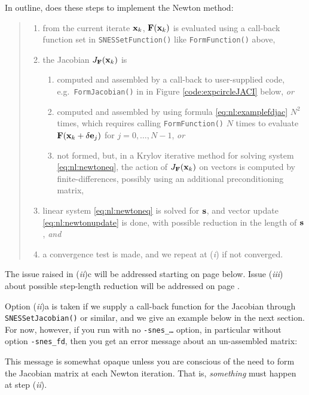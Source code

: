 In outline, \pSNES does these steps to implement the Newton method:
\begin{quote}
	\renewcommand{\labelenumi}{(\emph{\roman{enumi}})}
	\renewcommand{\labelenumii}{\emph{\alph{enumii}}.}
	\begin{enumerate}
	\item from the current iterate $\mathbf{x}_k$, $\mathbf{F}(\mathbf{x}_k)$ is evaluated using a call-back function set in \texttt{SNESSetFunction()} like \texttt{FormFunction()} above,
	\item the Jacobian $J_{\mathbf{F}}(\mathbf{x}_k)$ is
	    \begin{enumerate}
	    \item computed and assembled by a call-back to user-supplied code, e.g.~\texttt{FormJacobian()} in in Figure \ref{code:expcircleJACI} below, \emph{or}
	    \item computed and assembled by using formula \eqref{eq:nl:examplefdjac} $N^2$ times, which requires calling \texttt{FormFunction()} $N$ times to evaluate $\mathbf{F}(\mathbf{x}_k+\delta \mathbf{e}_j)$ for $j=0,\dots,N-1$, \emph{or}
	    \item not formed, but, in a Krylov iterative method for solving system \eqref{eq:nl:newtoneq}, the action of $J_{\mathbf{F}}(\mathbf{x}_k)$ on vectors is computed by finite-differences, possibly using an additional preconditioning matrix,
        \end{enumerate}
	\item linear system \eqref{eq:nl:newtoneq} is solved for $\mathbf{s}$, and vector update \eqref{eq:nl:newtonupdate} is done, with possible reduction in the length of $\mathbf{s}$, \emph{and}
	\item a convergence test is made, and we repeat at (\emph{i}) if not converged.
	\end{enumerate}
\end{quote}
The issue raised in (\emph{ii})c will be addressed starting on page \pageref{sec:JFNK} below.  Issue (\emph{iii}) about possible step-length reduction will be addressed on page \pageref{sec:linesearch}.

Option (\emph{ii})a is taken if we supply a call-back function for the Jacobian through \texttt{SNESSetJacobian()} or similar, and we give an example below in the next section.  For now, however, if you run with no \texttt{-snes\_\dots} option, in particular without option \texttt{-snes\_fd}, then you get an error message about an un-assembled matrix:
This message is somewhat opaque unless you are conscious of the need to form the Jacobian matrix at each Newton iteration.  That is, \emph{something} must happen at step (\emph{ii}).

